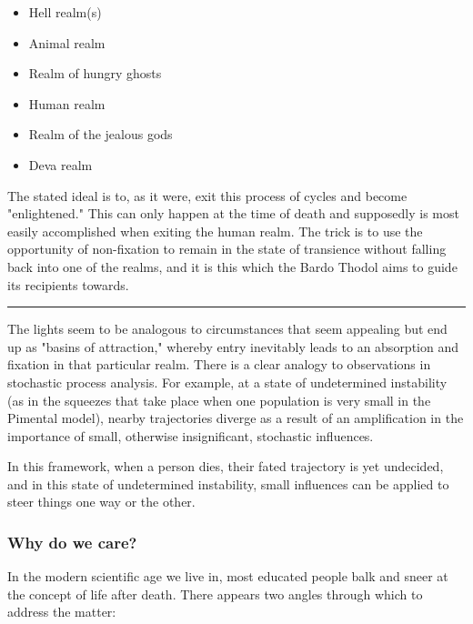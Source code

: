\begin{itemize} \item Hell realm(s) \item Animal realm \item Realm of hungry ghosts \item Human realm \item Realm of the jealous gods \item Deva realm \end{itemize}

The stated ideal is to, as it were, exit this process of cycles and become "enlightened." This can only happen at the time of death and supposedly is most easily accomplished when exiting the human realm. The trick is to use the opportunity of non-fixation to remain in the state of transience without falling back into one of the realms, and it is this which the Bardo Thodol aims to guide its recipients towards.

\vspace{5pt} \hrule \vspace{5pt}

The lights seem to be analogous to circumstances that seem appealing but end up as "basins of attraction," whereby entry inevitably leads to an absorption and fixation in that particular realm. There is a clear analogy to observations in stochastic process analysis. For example, at a state of undetermined instability (as in the squeezes that take place when one population is very small in the Pimental model), nearby trajectories diverge as a result of an amplification in the importance of small, otherwise insignificant, stochastic influences.

In this framework, when a person dies, their fated trajectory is yet undecided, and in this state of undetermined instability, small influences can be applied to steer things one way or the other.

\subsubsection*{Why do we care?} In the modern scientific age we live in, most educated people balk and sneer at the concept of life after death.  There appears two angles through which to address the matter:

